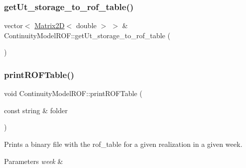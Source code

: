 \subsubsection{\texorpdfstring{get\+Ut\+\_\+storage\+\_\+to\+\_\+rof\+\_\+table()}{getUt\_storage\_to\_rof\_table()}}
{\footnotesize\ttfamily vector$<$ \mbox{\hyperlink{classMatrix2D}{Matrix2D}}$<$ double $>$ $>$ \& Continuity\+Model\+R\+O\+F\+::get\+Ut\+\_\+storage\+\_\+to\+\_\+rof\+\_\+table (\begin{DoxyParamCaption}{ }\end{DoxyParamCaption})}

\mbox{\label{classContinuityModelROF_a1bb8362ce39e694937a787805613e106_a1bb8362ce39e694937a787805613e106}} 
\subsubsection{\texorpdfstring{print\+R\+O\+F\+Table()}{printROFTable()}}
{\footnotesize\ttfamily void Continuity\+Model\+R\+O\+F\+::print\+R\+O\+F\+Table (\begin{DoxyParamCaption}\item[{const string \&}]{folder }\end{DoxyParamCaption})}

Prints a binary file with the rof\+\_\+table for a given realization in a given week. 
\begin{DoxyParams}{Parameters}
{\em week} & \\
\hline
\end{DoxyParams}
\mbox{\label{classContinuityModelROF_aa2348a2a5dea751462771ef538243e75_aa2348a2a5dea751462771ef538243e75}} 
